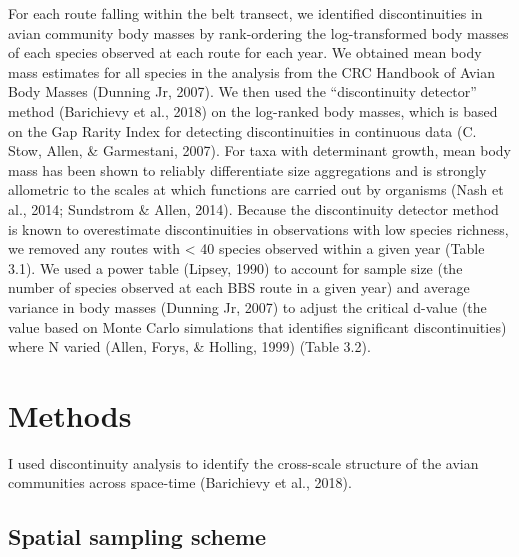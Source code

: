 \documentclass[12pt,twoside,openany]{reedthesis}
\begin{document}
For each route falling within the belt transect, we identified discontinuities in avian community body masses by rank-ordering the log-transformed body masses of each species observed at each route for each year. We obtained mean body mass estimates for all species in the analysis from the CRC Handbook of Avian Body Masses (Dunning Jr, 2007). We then used the ``discontinuity detector'' method (Barichievy et al., 2018) on the log-ranked body masses, which is based on the Gap Rarity Index for detecting discontinuities in continuous data (C. Stow, Allen, \& Garmestani, 2007). For taxa with determinant growth, mean body mass has been shown to reliably differentiate size aggregations and is strongly allometric to the scales at which functions are carried out by organisms (Nash et al., 2014; Sundstrom \& Allen, 2014). Because the discontinuity detector method is known to overestimate discontinuities in observations with low species richness, we removed any routes with \textless{} 40 species observed within a given year (Table 3.1). We used a power table (Lipsey, 1990) to account for sample size (the number of species observed at each BBS route in a given year) and average variance in body masses (Dunning Jr, 2007) to adjust the critical d-value (the value based on Monte Carlo simulations that identifies significant discontinuities) where N varied (Allen, Forys, \& Holling, 1999) (Table 3.2).

\hypertarget{methods-2}{%
\section{Methods}\label{methods-2}}

I used discontinuity analysis to identify the cross-scale structure of the avian communities across space-time (Barichievy et al., 2018).

\hypertarget{spatial-sampling-scheme}{%
\subsection{Spatial sampling scheme}\label{spatial-sampling-scheme}}
\end{document}
